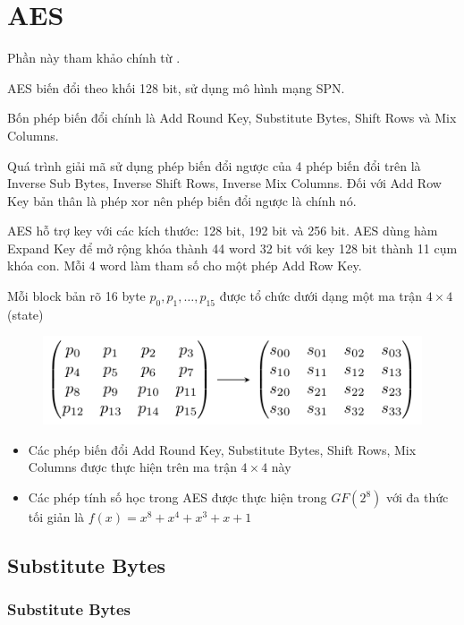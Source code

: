\chapter{AES}

Phần này tham khảo chính từ \cite{Stallings}.

AES biến đổi theo khối 128 bit, sử dụng mô hình mạng SPN.

Bốn phép biến đổi chính là Add Round Key, Substitute Bytes, Shift Rows và Mix Columns.

Quá trình giải mã sử dụng phép biến đổi ngược của 4 phép biến đổi trên là Inverse Sub Bytes, Inverse Shift Rows, Inverse Mix Columns. Đối với Add Row Key bản thân là phép xor nên phép biến đổi ngược là chính nó.

AES hỗ trợ key với các kích thước: 128 bit, 192 bit và 256 bit. AES dùng hàm Expand Key để mở rộng khóa thành 44 word 32 bit với key 128 bit thành 11 cụm khóa con. Mỗi 4 word làm tham số cho một phép Add Row Key.

Mỗi block bản rõ 16 byte $p_0, p_1, \ldots, p_{15}$ được tổ chức dưới dạng một ma trận $4 \times 4$ (state)

\begin{figure}[ht]
    \centering
    \includegraphics{AES/state.pdf}
\end{figure}    

\begin{itemize}
    \item Các phép biến đổi Add Round Key, Substitute Bytes, Shift Rows, Mix Columns được thực hiện trên ma trận $4 \times 4$ này
    \item Các phép tính số học trong AES được thực hiện trong $GF(2^8)$ với đa thức tối giản là $f(x) = x^8 + x^4 + x^3 + x + 1$
\end{itemize}

\section{Substitute Bytes}

\subsection{Substitute Bytes}

